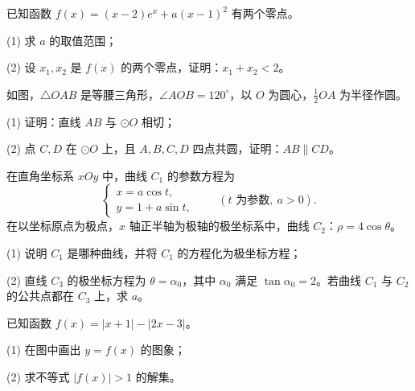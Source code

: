 \begin{question}
已知函数 $f(x)=(x-2)e^x+a(x-1)^2$ 有两个零点。

   (1) 求 $a$ 的取值范围；

   (2) 设 $x_1,x_2$ 是 $f(x)$ 的两个零点，证明：$x_1+x_2<2$。

\Needspace{0.4\textheight}
\end{question}
\begin{question}
如图，$\triangle OAB$ 是等腰三角形，$\angle AOB=120^\circ$，以 $O$ 为圆心，$\frac12 OA$ 为半径作圆。
\nopagebreak[4]
\begin{center}\end{center}
\nopagebreak[4]
   (1) 证明：直线 $AB$ 与 $\odot O$ 相切；

   (2) 点 $C,D$ 在 $\odot O$ 上，且 $A,B,C,D$ 四点共圆，证明：$AB\parallel CD$。

\end{question}
\begin{question}
在直角坐标系 $xOy$ 中，曲线 $C_1$ 的参数方程为
\nopagebreak[4]
\[
   \begin{cases}
   x=a\cos t,\\
   y=1+a\sin t,
   \end{cases}\qquad (t\text{ 为参数},\ a>0).
\]
   在以坐标原点为极点，$x$ 轴正半轴为极轴的极坐标系中，曲线 $C_2$：$\rho=4\cos\theta$。

   (1) 说明 $C_1$ 是哪种曲线，并将 $C_1$ 的方程化为极坐标方程；

   (2) 直线 $C_3$ 的极坐标方程为 $\theta=\alpha_0$，其中 $\alpha_0$ 满足 $\tan\alpha_0=2$。若曲线 $C_1$ 与 $C_2$ 的公共点都在 $C_3$ 上，求 $a$。

\Needspace{0.4\textheight}
\end{question}
\begin{question}
已知函数 $f(x)=|x+1|-|2x-3|$。

   (1) 在图中画出 $y=f(x)$ 的图象；

   (2) 求不等式 $|f(x)|>1$ 的解集。
\nopagebreak[4]
\begin{center}\end{center}
\nopagebreak[4]

\end{question}